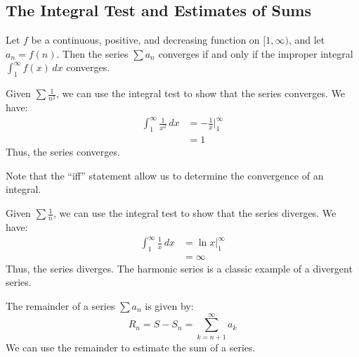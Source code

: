 \documentclass[11pt]{report}
\begin{document}
\subsection{The Integral Test and Estimates of Sums}
\begin{theorem}
    Let $f$ be a continuous, positive, and decreasing function on $[1, \infty)$, and let $a_n = f(n)$. Then the series $\sum a_n$ converges if and only if the improper integral $\int_1^{\infty} f(x) \, dx$ converges.
\end{theorem}
\begin{example}[$p$=2-series]
    Given $\sum \frac{1}{n^2}$, we can use the integral test to show that the series converges. We have:
    \begin{align*}
        \int_1^{\infty} \frac{1}{x^2} \, dx &= -\frac{1}{x} \Big|_1^{\infty} \\
        &= 1
    \end{align*}
    Thus, the series converges.
\end{example}
Note that the ``iff'' statement allow us to determine the convergence of an integral.
\begin{example}
    Given $\sum \frac{1}{n}$, we can use the integral test to show that the series diverges. We have:
    \begin{align*}
        \int_1^{\infty} \frac{1}{x} \, dx &= \ln x \Big|_1^{\infty} \\
        &= \infty
    \end{align*}
    Thus, the series diverges. The harmonic series is a classic example of a divergent series.
\end{example}
\begin{definition}[Remainder]
    The remainder of a series $\sum a_n$ is given by:
    \begin{equation}
        R_n = S - S_n = \sum_{k=n+1}^{\infty} a_k
    \end{equation}
    We can use the remainder to estimate the sum of a series.
\end{definition}
\end{document}
